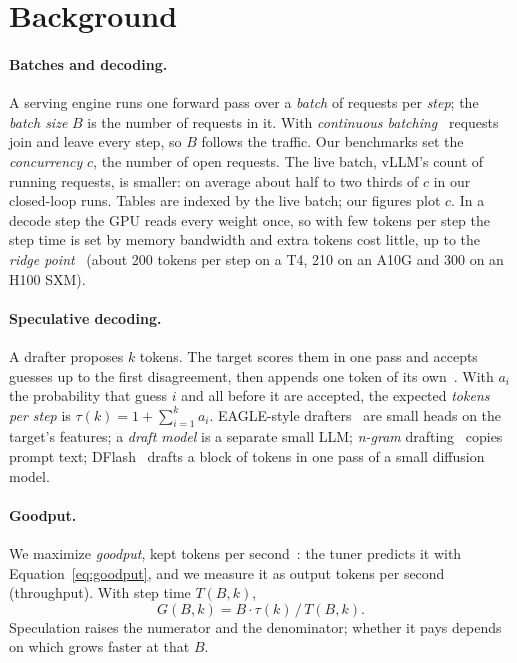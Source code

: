 \documentclass{article}
\newcommand{\term}[1]{\emph{#1}}
\begin{document}
\section{Background}
\label{sec:background}

\paragraph{Batches and decoding.} A serving engine runs one forward pass over a \term{batch} of requests per \term{step}; the \term{batch size} $B$ is the number of requests in it. With \term{continuous batching}~\cite{yu2022orca} requests join and leave every step, so $B$ follows the traffic. Our benchmarks set the \term{concurrency} $c$, the number of open requests. The live batch, vLLM's count of running requests, is smaller: on average about half to two thirds of $c$ in our closed-loop runs. Tables are indexed by the live batch; our figures plot $c$. In a decode step the GPU reads every weight once, so with few tokens per step the step time is set by memory bandwidth and extra tokens cost little, up to the \term{ridge point}~\cite{williams2009roofline} (about 200 tokens per step on a T4, 210 on an A10G and 300 on an H100 SXM).

\paragraph{Speculative decoding.} A drafter proposes $k$ tokens. The target scores them in one pass and accepts guesses up to the first disagreement, then appends one token of its own~\cite{leviathan2023fast,chen2023accelerating}. With $a_i$ the probability that guess $i$ and all before it are accepted, the expected \term{tokens per step} is $\tau(k) = 1 + \sum_{i=1}^{k} a_i$. EAGLE-style drafters~\cite{li2024eagle,li2024eagle2,li2025eagle3} are small heads on the target's features; a \term{draft model} is a separate small LLM; \term{n-gram} drafting~\cite{saxena2023prompt} copies prompt text; DFlash~\cite{chen2026dflash} drafts a block of tokens in one pass of a small diffusion model.

\paragraph{Goodput.} We maximize \term{goodput}, kept tokens per second~\cite{liu2024turbospec}: the tuner predicts it with Equation~\ref{eq:goodput}, and we measure it as output tokens per second (throughput). With step time $T(B,k)$,
\begin{equation}
G(B,k) = B \cdot \tau(k) \,/\, T(B,k) .
\label{eq:goodput}
\end{equation}
Speculation raises the numerator and the denominator; whether it pays depends on which grows faster at that $B$.
\end{document}
